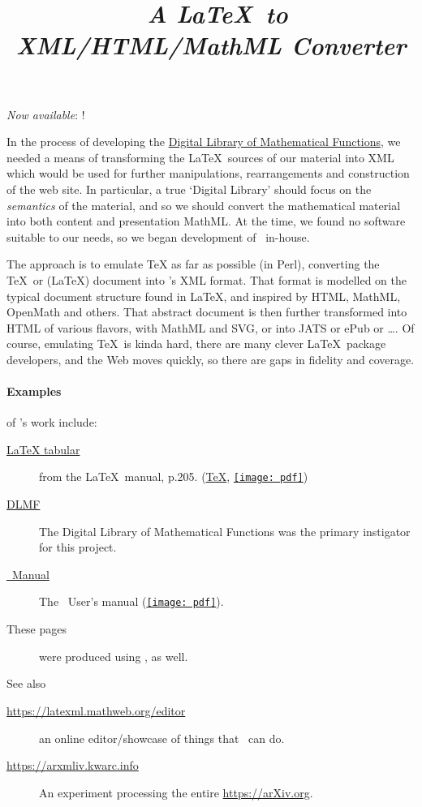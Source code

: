 \documentclass{article}
\title{\LaTeXML\ \emph{A \LaTeX\ to XML/HTML/MathML Converter}}
\newcommand{\PDFIcon}{\texttt{[image: pdf]}}
\begin{document}
\label{top}
\maketitle

\emph{Now available}:  !

In the process of developing the
\href{https://dlmf.nist.gov/}{Digital Library of Mathematical Functions},
we needed a means of transforming
the \LaTeX\ sources of our material into XML which would be used
for further manipulations, rearrangements and construction of the web site.
In particular, a true `Digital Library' should focus on the \emph{semantics}
of the material, and so we should convert the mathematical material into both
content and presentation MathML.
At the time, we found no software suitable to our needs, so we began
development of \LaTeXML\ in-house.  

The approach is to emulate TeX as far as possible (in Perl), converting
the \TeX\ or (\LaTeX) document into \LaTeXML's XML format. That format
is modelled on the typical document structure found in \LaTeX, and inspired by
HTML, MathML, OpenMath and others.  That abstract document is then further
transformed into HTML of various flavors, with MathML and SVG,
or into JATS or ePub or \ldots.
Of course, emulating \TeX\ is kinda hard,
there are many clever \LaTeX\ package developers,
and the Web moves quickly,
so there are gaps in fidelity and coverage.

\paragraph*{Examples} of \LaTeXML's work include:
%
\begin{description}
\item[\href{examples/tabular/tabular.html}{LaTeX tabular}]
    from the \LaTeX\ manual, p.205.
    (\href{examples/tabular/tabular.tex}{\TeX},
     \href{examples/tabular/tabular.pdf}{\PDFIcon})
\item[\href{https://dlmf.nist.gov/}{DLMF}]
   The Digital Library of Mathematical Functions was the
   primary instigator for this project.
\item[\href{manual/}{\LaTeXML\ Manual}]
   The \LaTeXML\ User's manual (\href{manual.pdf}{\PDFIcon}).
\item[These pages] were produced using \LaTeXML, as well.
\end{description}
See also
\begin{description}
\item[\url{https://latexml.mathweb.org/editor}] an online editor/showcase
  of things that \LaTeXML\ can do.
\item[\url{https://arxmliv.kwarc.info}] An experiment processing
  the entire \url{https://arXiv.org}.
\end{description}
\end{document}
